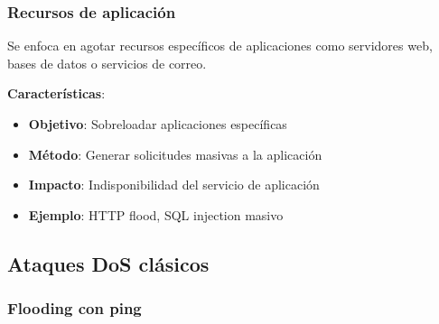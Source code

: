 \subsubsection{Recursos de aplicación}

Se enfoca en agotar recursos específicos de aplicaciones como servidores web, bases de datos o servicios de correo.

\textbf{Características}:
\begin{itemize}
    \item \textbf{Objetivo}: Sobreloadar aplicaciones específicas
    \item \textbf{Método}: Generar solicitudes masivas a la aplicación
    \item \textbf{Impacto}: Indisponibilidad del servicio de aplicación
    \item \textbf{Ejemplo}: HTTP flood, SQL injection masivo
\end{itemize}

\subsection{Ataques DoS clásicos}

\subsubsection{Flooding con ping}
